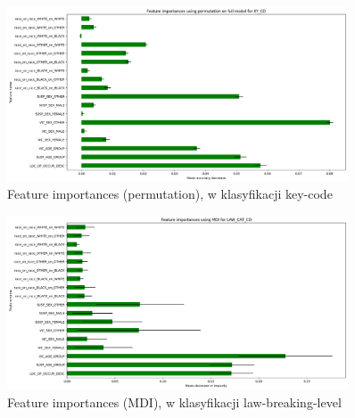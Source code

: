 \documentclass{classrep}
\begin{document}
{{{{                    \begin{figure}[!htbp]
                        \centering
                        \includegraphics[width=0.9\textwidth]{img/5.1.3/4/Feature importances using permutation on full model for KY_CD.png}
                        \caption{Feature importances (permutation), w klasyfikacji key-code}
                        \label{goal_1_exp_4_imp_perm_key}
                    \end{figure}
                    
                    \begin{figure}[!htbp]
                        \centering
                        \includegraphics[width=0.9\textwidth]{img/5.1.3/4/Feature importances using MDI for LAW_CAT_CD.png}
                        \caption{Feature importances (MDI), w klasyfikacji law-breaking-level}
                        \label{goal_1_exp_4_imp_mdi_law}
                    \end{figure}
                    
}}}}
\end{document}
